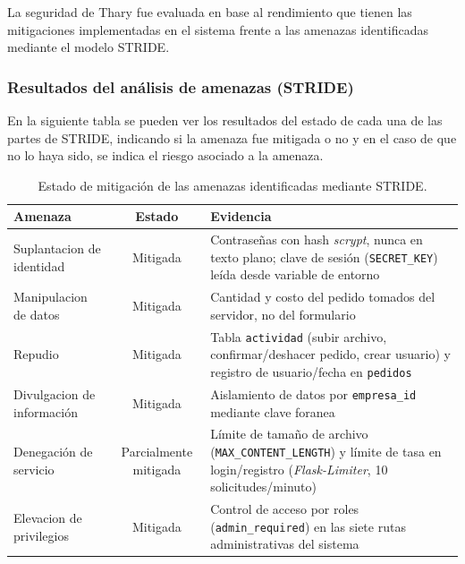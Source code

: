 La seguridad de Thary fue evaluada en base al rendimiento que tienen las mitigaciones implementadas en el sistema frente a las amenazas identificadas mediante el modelo STRIDE.

\subsubsection{Resultados del análisis de amenazas (STRIDE)}

En la siguiente tabla se pueden ver los resultados del estado de cada una de las partes de STRIDE, indicando si la amenaza fue mitigada o no y en el caso de que no lo haya sido, se indica el riesgo asociado a la amenaza.

\begin{table}[H]
    \centering
    \caption{Estado de mitigación de las amenazas identificadas mediante STRIDE.}
    \label{tab:resultados_stride}
    \renewcommand{\arraystretch}{1.3}
    \begin{tabularx}{\textwidth}{|l|c|X|}
    \hline
    \textbf{Amenaza} & \textbf{Estado} & \textbf{Evidencia} \\
    \hline
    Suplantacion de identidad & Mitigada & Contraseñas con hash \textit{scrypt}, nunca en texto plano; clave de sesión (\texttt{SECRET\_KEY}) leída desde variable de entorno \\
    \hline
    Manipulacion de datos & Mitigada & Cantidad y costo del pedido tomados del servidor, no del formulario \\
    \hline
    Repudio & Mitigada & Tabla \texttt{actividad} (subir archivo, confirmar/deshacer pedido, crear usuario) y registro de usuario/fecha en \texttt{pedidos} \\
    \hline
    Divulgacion de información & Mitigada & Aislamiento de datos por \texttt{empresa\_id} mediante clave foranea \\
    \hline
    Denegación de servicio & Parcialmente mitigada & Límite de tamaño de archivo (\texttt{MAX\_CONTENT\_LENGTH}) y límite de tasa en login/registro (\textit{Flask-Limiter}, 10 solicitudes/minuto) \\
    \hline
    Elevacion de privilegios & Mitigada & Control de acceso por roles (\texttt{admin\_required}) en las siete rutas administrativas del sistema \\
    \hline
    \end{tabularx}
\end{table}

